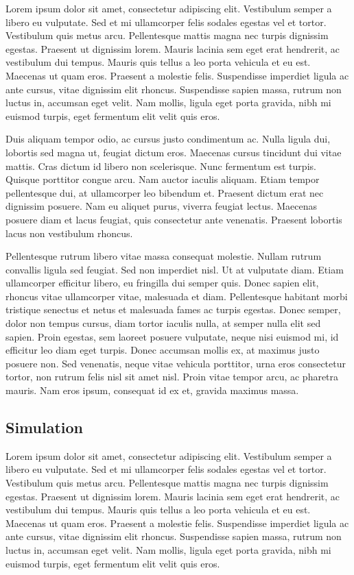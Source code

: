 \documentclass{acm_proc_article-sp}
\begin{document}
Lorem ipsum dolor sit amet, consectetur adipiscing elit. Vestibulum semper a libero eu vulputate. Sed et mi ullamcorper felis sodales egestas vel et tortor. Vestibulum quis metus arcu. Pellentesque mattis magna nec turpis dignissim egestas. Praesent ut dignissim lorem. Mauris lacinia sem eget erat hendrerit, ac vestibulum dui tempus. Mauris quis tellus a leo porta vehicula et eu est. Maecenas ut quam eros. Praesent a molestie felis. Suspendisse imperdiet ligula ac ante cursus, vitae dignissim elit rhoncus. Suspendisse sapien massa, rutrum non luctus in, accumsan eget velit. Nam mollis, ligula eget porta gravida, nibh mi euismod turpis, eget fermentum elit velit quis eros.

Duis aliquam tempor odio, ac cursus justo condimentum ac. Nulla ligula dui, lobortis sed magna ut, feugiat dictum eros. Maecenas cursus tincidunt dui vitae mattis. Cras dictum id libero non scelerisque. Nunc fermentum est turpis. Quisque porttitor congue arcu. Nam auctor iaculis aliquam. Etiam tempor pellentesque dui, at ullamcorper leo bibendum et. Praesent dictum erat nec dignissim posuere. Nam eu aliquet purus, viverra feugiat lectus. Maecenas posuere diam et lacus feugiat, quis consectetur ante venenatis. Praesent lobortis lacus non vestibulum rhoncus.

Pellentesque rutrum libero vitae massa consequat molestie. Nullam rutrum convallis ligula sed feugiat. Sed non imperdiet nisl. Ut at vulputate diam. Etiam ullamcorper efficitur libero, eu fringilla dui semper quis. Donec sapien elit, rhoncus vitae ullamcorper vitae, malesuada et diam. Pellentesque habitant morbi tristique senectus et netus et malesuada fames ac turpis egestas. Donec semper, dolor non tempus cursus, diam tortor iaculis nulla, at semper nulla elit sed sapien. Proin egestas, sem laoreet posuere vulputate, neque nisi euismod mi, id efficitur leo diam eget turpis. Donec accumsan mollis ex, at maximus justo posuere non. Sed venenatis, neque vitae vehicula porttitor, urna eros consectetur tortor, non rutrum felis nisl sit amet nisl. Proin vitae tempor arcu, ac pharetra mauris. Nam eros ipsum, consequat id ex et, gravida maximus massa.

\subsection{Simulation}

Lorem ipsum dolor sit amet, consectetur adipiscing elit. Vestibulum semper a libero eu vulputate. Sed et mi ullamcorper felis sodales egestas vel et tortor. Vestibulum quis metus arcu. Pellentesque mattis magna nec turpis dignissim egestas. Praesent ut dignissim lorem. Mauris lacinia sem eget erat hendrerit, ac vestibulum dui tempus. Mauris quis tellus a leo porta vehicula et eu est. Maecenas ut quam eros. Praesent a molestie felis. Suspendisse imperdiet ligula ac ante cursus, vitae dignissim elit rhoncus. Suspendisse sapien massa, rutrum non luctus in, accumsan eget velit. Nam mollis, ligula eget porta gravida, nibh mi euismod turpis, eget fermentum elit velit quis eros.
\end{document}
